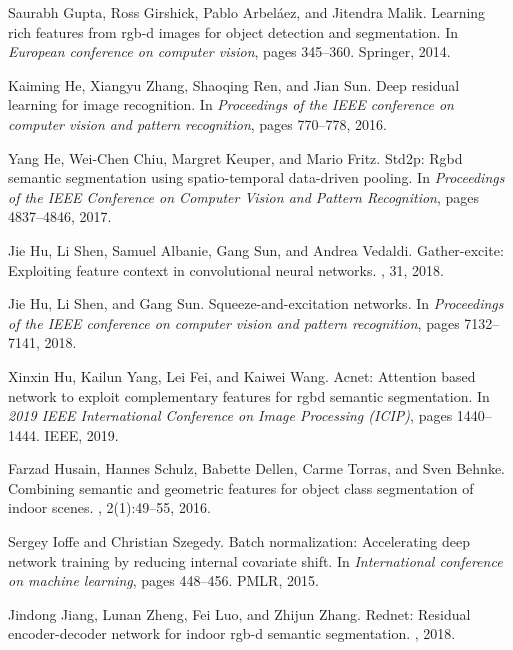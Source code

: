 \documentclass[10pt,twocolumn,letterpaper]{article}
\begin{document}
\begin{thebibliography}{10}
Saurabh Gupta, Ross Girshick, Pablo Arbel{\'a}ez, and Jitendra Malik.
\newblock Learning rich features from rgb-d images for object detection and
  segmentation.
\newblock In {\em European conference on computer vision}, pages 345--360.
  Springer, 2014.

Kaiming He, Xiangyu Zhang, Shaoqing Ren, and Jian Sun.
\newblock Deep residual learning for image recognition.
\newblock In {\em Proceedings of the IEEE conference on computer vision and
  pattern recognition}, pages 770--778, 2016.

Yang He, Wei-Chen Chiu, Margret Keuper, and Mario Fritz.
\newblock Std2p: Rgbd semantic segmentation using spatio-temporal data-driven
  pooling.
\newblock In {\em Proceedings of the IEEE Conference on Computer Vision and
  Pattern Recognition}, pages 4837--4846, 2017.

Jie Hu, Li Shen, Samuel Albanie, Gang Sun, and Andrea Vedaldi.
\newblock Gather-excite: Exploiting feature context in convolutional neural
  networks.
, 31, 2018.

Jie Hu, Li Shen, and Gang Sun.
\newblock Squeeze-and-excitation networks.
\newblock In {\em Proceedings of the IEEE conference on computer vision and
  pattern recognition}, pages 7132--7141, 2018.

Xinxin Hu, Kailun Yang, Lei Fei, and Kaiwei Wang.
\newblock Acnet: Attention based network to exploit complementary features for
  rgbd semantic segmentation.
\newblock In {\em 2019 IEEE International Conference on Image Processing
  (ICIP)}, pages 1440--1444. IEEE, 2019.

Farzad Husain, Hannes Schulz, Babette Dellen, Carme Torras, and Sven Behnke.
\newblock Combining semantic and geometric features for object class
  segmentation of indoor scenes.
, 2(1):49--55, 2016.

Sergey Ioffe and Christian Szegedy.
\newblock Batch normalization: Accelerating deep network training by reducing
  internal covariate shift.
\newblock In {\em International conference on machine learning}, pages
  448--456. PMLR, 2015.

Jindong Jiang, Lunan Zheng, Fei Luo, and Zhijun Zhang.
\newblock Rednet: Residual encoder-decoder network for indoor rgb-d semantic
  segmentation.
, 2018.


\end{thebibliography}
\end{document}
